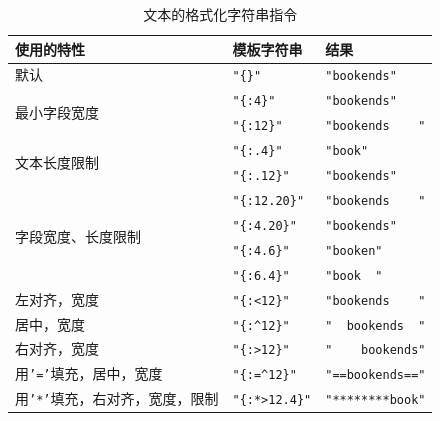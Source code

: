 \begin{longtable}{p{}p{}p{}}
    \caption{文本的格式化字符串指令}
    \label{t17-5}\\
    \hline
    \textbf{使用的特性} & \textbf{模板字符串} & \textbf{结果} \\
    \hline
    默认 & \texttt{"\{\}"} & \texttt{"bookends"} \\
    \hline

    \multirow{2}{*}{最小字段宽度} & \texttt{"\{:4\}"} \cellcolor{tablecolor} & \texttt{"bookends"} \cellcolor{tablecolor} \\
    & \texttt{"\{:12\}"} & \texttt{"bookends\ \ \ \ "} \\
    \hline
    \multirow{2}{*}{文本长度限制} & \texttt{"\{:.4\}"} & \texttt{"book"} \\

    & \texttt{"\{:.12\}"} \cellcolor{tablecolor} & \texttt{"bookends"} \cellcolor{tablecolor} \\
    \hline
    \multirow{4}{*}{字段宽度、长度限制} & \texttt{"\{:12.20\}"} & \texttt{"bookends\ \ \ \ "} \\

    & \texttt{"\{:4.20\}"} \cellcolor{tablecolor} & \texttt{"bookends"} \cellcolor{tablecolor} \\
    & \texttt{"\{:4.6\}"} & \texttt{"booken"} \\

    & \texttt{"\{:6.4\}"} \cellcolor{tablecolor} & \texttt{"book\ \ "} \cellcolor{tablecolor} \\
    \hline

    左对齐，宽度 & \texttt{"\{:<12\}"} \cellcolor{tablecolor} & \texttt{"bookends\ \ \ \ "} \cellcolor{tablecolor} \\
    \hline
    居中，宽度 & \texttt{"\{:\^{}12\}"} & \texttt{"\ \ bookends\ \ "} \\
    \hline

    右对齐，宽度 & \texttt{"\{:>12\}"} \cellcolor{tablecolor} & \texttt{"\ \ \ \ bookends"} \cellcolor{tablecolor} \\
    \hline
    用\texttt{'='}填充，居中，宽度 & \texttt{"\{:=\^{}12\}"} & \texttt{"==bookends=="} \\
    \hline

    用\texttt{'*'}填充，右对齐，宽度，限制 & \texttt{"\{:*>12.4\}"} \cellcolor{tablecolor} & \texttt{"********book"} \cellcolor{tablecolor} \\
    \hline
\end{longtable}

